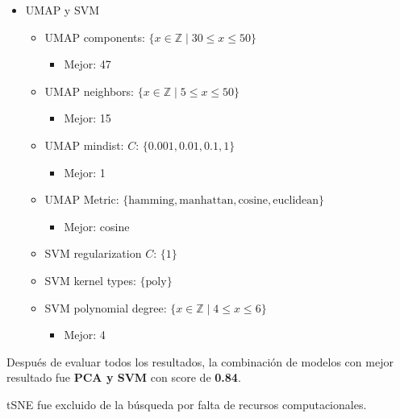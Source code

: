 \documentclass[journal]{IEEEtran}
\begin{document}
\begin{otherlanguage}{english}
\begin{itemize}
        \item UMAP y SVM
        \begin{itemize}
                \item UMAP components: \( \{ x \in \mathbb{Z} \mid 30 \leq x \leq 50 \} \)
                \begin{itemize}
                        \item Mejor: 47
                \end{itemize}
                \item UMAP neighbors: \( \{ x \in \mathbb{Z} \mid 5 \leq x \leq 50 \} \)
                \begin{itemize}
                        \item Mejor: 15
                \end{itemize}
                \item UMAP mindist: \( C \): \( \{ 0.001, 0.01, 0.1, 1 \} \)
                \begin{itemize}
                        \item Mejor: 1
                \end{itemize}
                \item UMAP Metric: \( \{ \text{hamming}, \text{manhattan}, \text{cosine}, \allowbreak \text{euclidean} \} \)
                \begin{itemize}
                        \item Mejor: cosine
                \end{itemize}
                \item SVM regularization \( C \): \( \{ 1 \} \)
                \item SVM kernel types: \( \{ \text{poly} \} \)
                \item SVM polynomial degree: \( \{ x \in \mathbb{Z} \mid 4 \leq x \leq 6 \} \)
                \begin{itemize}
                        \item Mejor: 4
                \end{itemize}
        \end{itemize}
        
\end{itemize}
\end{otherlanguage}

Después de evaluar todos los resultados, la combinación de modelos con mejor resultado fue \textbf{PCA y SVM} con score de \textbf{0.84}.

tSNE fue excluido de la búsqueda por falta de recursos computacionales.
\end{document}
